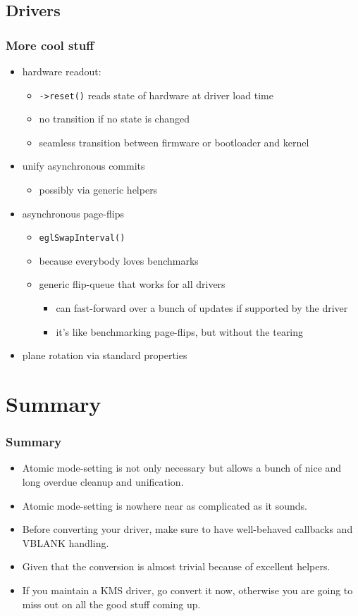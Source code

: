 \documentclass[t]{beamer}
\begin{document}
\subsection{Drivers}

\begin{frame}
	\frametitle{More cool stuff}
	\begin{itemize}
		\item hardware readout:
			\begin{itemize}
				\item {\tt ->reset()} reads state of hardware at driver load
					time
				\item no transition if no state is changed
				\item seamless transition between firmware or bootloader and
					kernel
			\end{itemize}
		\item unify asynchronous commits
			\begin{itemize}
				\item possibly via generic helpers
			\end{itemize}
		\item asynchronous page-flips
			\begin{itemize}
				\item {\tt eglSwapInterval()}
				\item because everybody loves benchmarks
				\item generic flip-queue that works for all drivers
					\begin{itemize}
						\item can fast-forward over a bunch of updates if
							supported by the driver
						\item it's like benchmarking page-flips, but without
							the tearing
					\end{itemize}
			\end{itemize}
		\item plane rotation via standard properties
	\end{itemize}
\end{frame}

\section{Summary}

\begin{frame}
	\frametitle{Summary}
	\begin{itemize}
		\item Atomic mode-setting is not only necessary but allows a bunch of
			nice and long overdue cleanup and unification.
		\item Atomic mode-setting is nowhere near as complicated as it sounds.
		\item Before converting your driver, make sure to have well-behaved
			callbacks and VBLANK handling.
		\item Given that the conversion is almost trivial because of excellent
			helpers.
		\item If you maintain a KMS driver, go convert it now, otherwise you
			are going to miss out on all the good stuff coming up.
	\end{itemize}
\end{frame}
\end{document}
